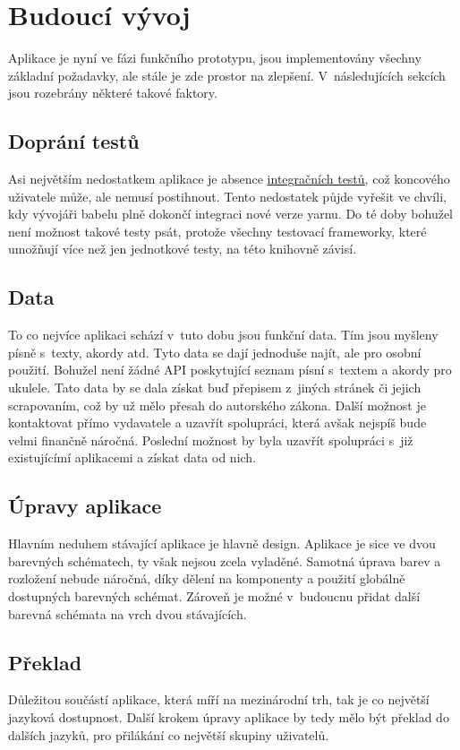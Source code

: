 \section{Budoucí vývoj}
\label{sc:upcomming_development}
Aplikace je nyní ve fázi funkčního prototypu, jsou implementovány všechny základní požadavky, ale stále je zde prostor na zlepšení. V~následujících sekcích jsou rozebrány některé takové faktory.

\subsection{Doprání testů}
Asi největším nedostatkem aplikace je absence \hyperref[sc:unit_tests]{integračních testů}, což koncového uživatele může, ale nemusí postihnout. Tento nedostatek půjde vyřešit ve chvíli, kdy vývojáři babelu plně dokončí integraci nové verze yarnu. Do té doby bohužel není možnost takové testy psát, protože všechny testovací frameworky, které umožňují více než jen jednotkové testy, na této knihovně závisí.

\subsection{Data}
To co nejvíce aplikaci schází v~tuto dobu jsou funkční data. Tím jsou myšleny písně s~texty, akordy atd. Tyto data se dají jednoduše najít, ale pro osobní použití. Bohužel není žádné API poskytující seznam písní s~textem a akordy pro ukulele. Tato data by se dala získat buď přepisem z~jiných stránek či jejich scrapovaním, což by už mělo přesah do autorského zákona. Další možnost je kontaktovat přímo vydavatele a uzavřít spolupráci, která avšak nejspíš bude velmi finančně náročná. Poslední možnost by byla uzavřít spolupráci s~již existujícímí aplikacemi a získat data od nich.

\subsection{Úpravy aplikace}
Hlavním neduhem stávající aplikace je hlavně design. Aplikace je sice ve dvou barevných schématech, ty však nejsou zcela vyladěné. Samotná úprava barev a rozložení nebude náročná, díky dělení na komponenty a použití globálně dostupných barevných schémat. Zároveň je možné v~budoucnu přidat další barevná schémata na vrch dvou stávajících.

\subsection{Překlad}
Důležitou součástí aplikace, která míří na mezinárodní trh, tak je co největší jazyková dostupnost. Další krokem úpravy aplikace by tedy mělo být překlad do dalších jazyků, pro přilákání co největší skupiny uživatelů.

